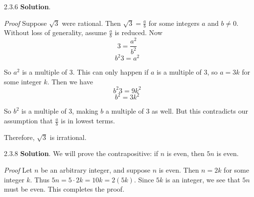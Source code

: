 \documentclass[11pt,]{book}
\makeatletter
\theoremstyle{ptxplainnotitle}
\theoremstyle{ptxplaintitle}
\renewcommand*{\proofname}{Proof}
\renewenvironment{proof}[1][\proofname]{\par
  \pushQED{\qed}%
  \normalfont \topsep6\p@\@plus6\p@\relax
  \trivlist
  \item\relax
    {\itshape
    #1\@addpunct{.}}\hspace\labelsep\ignorespaces
}{%
  \popQED\endtrivlist\@endpefalse
}
\theoremstyle{ptxdefinitionnotitle}
\theoremstyle{ptxdefinitiontitle}
\theoremstyle{ptxdefinitionnotitle}
\theoremstyle{ptxdefinitiontitle}
\theoremstyle{ptxdefinitionnotitle}
\theoremstyle{ptxdefinitiontitle}
\theoremstyle{ptxdefinitiontitlenonumber}
\theoremstyle{ptxdefinitiontitlenonumber}
\numberwithin{equation}{chapter}
\makeatother
\begin{document}
\begin{divisionexercise}{2.3.6}
\textbf{Solution}.\quad%
\begin{proof}\hypertarget{proof-36}{}
\hypertarget{p-2643}{}%
Suppose \(\sqrt{3}\) were rational. Then \(\sqrt{3} = \frac{a}{b}\) for some integers \(a\) and \(b \ne 0\). Without loss of generality, assume \(\frac{a}{b}\) is reduced. Now%
\begin{equation*}
3 = \frac{a^2}{b^2}
\end{equation*}
%
\begin{equation*}
b^2 3 = a^2
\end{equation*}
%
\par
\hypertarget{p-2644}{}%
So \(a^2\) is a multiple of 3. This can only happen if \(a\) is a multiple of 3, so \(a = 3k\) for some integer \(k\). Then we have%
\begin{equation*}
b^2 3 = 9k^2
\end{equation*}
%
\begin{equation*}
b^2 = 3k^2
\end{equation*}
%
\par
\hypertarget{p-2645}{}%
So \(b^2\) is a multiple of 3, making \(b\) a multiple of 3 as well. But this contradicts our assumption that \(\frac{a}{b}\) is in lowest terms.%
\par
\hypertarget{p-2646}{}%
Therefore, \(\sqrt{3}\) is irrational.%
\end{proof}
\end{divisionexercise}%
\begin{divisionexercise}{2.3.8}
\textbf{Solution}.\quad%
\hypertarget{p-2652}{}%
We will prove the contrapositive: if \(n\) is even, then \(5n\) is even.%
\begin{proof}\hypertarget{proof-37}{}
\hypertarget{p-2653}{}%
Let \(n\) be an arbitrary integer, and suppose \(n\) is even. Then \(n = 2k\) for some integer \(k\). Thus \(5n = 5\cdot 2k = 10k = 2(5k)\). Since \(5k\) is an integer, we see that \(5n\) must be even. This completes the proof.%
\end{proof}
\end{divisionexercise}%
\end{document}
